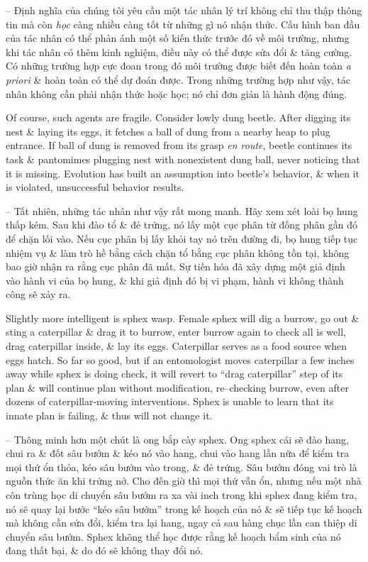\documentclass{article}
\begin{document}
\begin{itemize}
\begin{itemize}
\begin{itemize}
\begin{itemize}
				-- Định nghĩa của chúng tôi yêu cầu một tác nhân lý trí không chỉ thu thập thông tin mà còn {\it học} càng nhiều càng tốt từ những gì nó nhận thức. Cấu hình ban đầu của tác nhân có thể phản ánh một số kiến thức trước đó về môi trường, nhưng khi tác nhân có thêm kinh nghiệm, điều này có thể được sửa đổi \& tăng cường. Có những trường hợp cực đoan trong đó môi trường được biết đến hoàn toàn {\it a priori} \& hoàn toàn có thể dự đoán được. Trong những trường hợp như vậy, tác nhân không cần phải nhận thức hoặc học; nó chỉ đơn giản là hành động đúng.
				
				Of course, such agents are fragile. Consider lowly dung beetle. After digging its nest \& laying its eggs, it fetches a ball of dung from a nearby heap to plug entrance. If ball of dung is removed from its grasp {\it en route}, beetle continues its task \& pantomimes plugging nest with nonexistent dung ball, never noticing that it is missing. Evolution has built an assumption into beetle's behavior, \& when it is violated, unsuccessful behavior results.
				
				-- Tất nhiên, những tác nhân như vậy rất mong manh. Hãy xem xét loài bọ hung thấp kém. Sau khi đào tổ \& đẻ trứng, nó lấy một cục phân từ đống phân gần đó để chặn lối vào. Nếu cục phân bị lấy khỏi tay nó trên đường đi, bọ hung tiếp tục nhiệm vụ \& làm trò hề bằng cách chặn tổ bằng cục phân không tồn tại, không bao giờ nhận ra rằng cục phân đã mất. Sự tiến hóa đã xây dựng một giả định vào hành vi của bọ hung, \& khi giả định đó bị vi phạm, hành vi không thành công sẽ xảy ra.
				
				Slightly more intelligent is sphex wasp. Female sphex will dig a burrow, go out \& sting a caterpillar \& drag it to burrow, enter burrow again to check all is well, drag caterpillar inside, \& lay its eggs. Caterpillar serves as a food source when eggs hatch. So far so good, but if an entomologist moves caterpillar a few inches away while sphex is doing check, it will revert to ``drag caterpillar'' step of its plan \& will continue plan without modification, re--checking burrow, even after dozens of caterpillar-moving interventions. Sphex is unable to learn that its innate plan is failing, \& thus will not change it.
				
				-- Thông minh hơn một chút là ong bắp cày sphex. Ong sphex cái sẽ đào hang, chui ra \& đốt sâu bướm \& kéo nó vào hang, chui vào hang lần nữa để kiểm tra mọi thứ ổn thỏa, kéo sâu bướm vào trong, \& đẻ trứng. Sâu bướm đóng vai trò là nguồn thức ăn khi trứng nở. Cho đến giờ thì mọi thứ vẫn ổn, nhưng nếu một nhà côn trùng học di chuyển sâu bướm ra xa vài inch trong khi sphex đang kiểm tra, nó sẽ quay lại bước ``kéo sâu bướm'' trong kế hoạch của nó \& sẽ tiếp tục kế hoạch mà không cần sửa đổi, kiểm tra lại hang, ngay cả sau hàng chục lần can thiệp di chuyển sâu bướm. Sphex không thể học được rằng kế hoạch bẩm sinh của nó đang thất bại, \& do đó sẽ không thay đổi nó.
				

\end{itemize}
\end{itemize}
\end{itemize}
\end{itemize}
\end{document}
